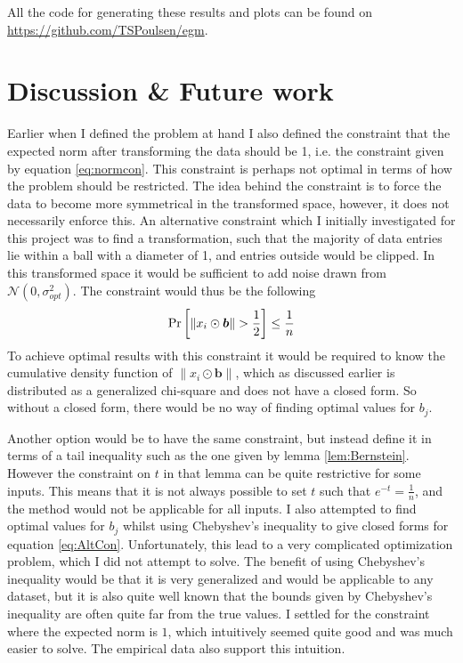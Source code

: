 \documentclass[a4paper,12pt]{article}
\begin{document}
\noindent All the code for generating these results and plots can be found on \url{https://github.com/TSPoulsen/egm}.

\newpage
\section{Discussion \& Future work}
Earlier when I defined the problem at hand I also defined the constraint that the expected norm after 
transforming the data should be 1, i.e. the constraint given by equation \eqref{eq:normcon}. 
This constraint is perhaps not optimal in terms of how the problem should be restricted. The idea behind the constraint
is to force the data to become more symmetrical in the transformed space, however, it does not necessarily enforce this. 
An alternative constraint which I initially investigated for this project was to find a transformation, such that the majority of 
data entries lie within a ball with a diameter of 1, and entries outside would be clipped.
In this transformed space it would be sufficient to add noise drawn from
$\mathcal{N}(0, \sigma_{opt}^2)$. The constraint would thus be the following
\begin{equation}
\label{eq:AltCon}
    \Pr\left [ \| x_i \odot \bm{b} \| > \frac{1}{2} \right] \le \frac{1}{n} 
\end{equation}
To achieve optimal results with this constraint it would be required to know the cumulative density function of $\| x_i \odot \bm{b} \|$, 
which as discussed earlier is distributed as a generalized chi-square and does not have a closed form. 
So without a closed form, there would be no way of finding optimal values for $b_j$. 

Another option would be to have the same constraint, but instead define it in terms of a tail inequality such as the one
given by lemma \ref{lem:Bernstein}. However the constraint on $t$ in that lemma can be quite restrictive for some inputs. 
This means that it is not always possible to set $t$ such that $e^{-t} = \frac{1}{n}$, 
and the method would not be applicable for all inputs.
I also attempted to find optimal values for $b_j$ whilst using Chebyshev's inequality to give closed forms for equation \eqref{eq:AltCon}.
Unfortunately, this lead to a very complicated optimization problem, which I did not attempt to solve.
The benefit of using Chebyshev's inequality would be that it is very generalized and would be applicable to any dataset, 
but it is also quite well known that the bounds given by Chebyshev's inequality are often quite far from the true values. 
I settled for the constraint where the expected norm is $1$, which intuitively seemed quite good and was much easier to solve. 
The empirical data also support this intuition. \\
\end{document}
